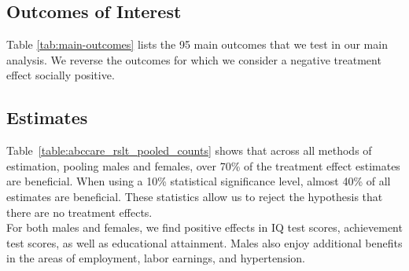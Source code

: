 \subsection{Outcomes of Interest}

\noindent Table \ref{tab:main-outcomes} lists the 95 main outcomes that we test in our main analysis. We reverse the outcomes for which we consider a negative treatment effect socially positive. \\

\singlespacing

\doublespacing

\subsection{Estimates} \label{appendix:estimates}

\noindent Table~\ref{table:abccare_rslt_pooled_counts} shows that across all methods of estimation, pooling males and females, over 70\% of the treatment effect estimates are beneficial. When using a 10\% statistical significance level, almost 40\% of all estimates are beneficial. These statistics allow us to reject the hypothesis that there are no treatment effects. \\

\noindent For both males and females, we find positive effects in IQ test scores, achievement test scores, as well as educational attainment. Males also enjoy additional benefits in the areas of employment, labor earnings, and hypertension. \\

